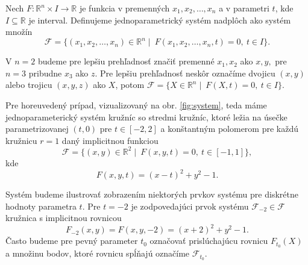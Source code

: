 
\begin{definition}
Nech $F \colon \mathbb{R}^{n} \times I \rightarrow \mathbb{R}$ je funkcia v premenných $ x_{1}, x_{2}, \ldots, x_{n} $ a v parametri $t$, kde $I \subseteq \mathbb{R}$ je interval. Definujeme jednoparametrický systém nadplôch ako systém množín 
$$
\mathcal{F} = \{ (x_{1}, x_{2}, \ldots, x_{n}) \in \mathbb{R}^{n} \mid  \ F(x_{1}, x_{2}, \ldots, x_{n}, t) = 0, \ t \in I \}.
$$
\end{definition}

V $n = 2$ budeme pre lepšiu prehľadnosť značiť premenné $x_{1}, x_{2}$ ako $x, y,$ pre $n = 3$ pribudne $x_{3}$ ako $z.$ Pre lepšiu prehľadnosť neskôr označíme dvojicu $(x,y)$ alebo trojicu $(x,y,z)$ ako $X$, potom
$\mathcal{F} = \{ X \in \mathbb{R}^{n} \mid \ F(X, t) = 0, \ t \in I \}. $

Pre horeuvedený prípad, vizualizovaný na obr. \ref{fig:system}, teda máme jednoparameterický systém kružníc so stredmi kružníc, ktoré ležia na úsečke parametrizovanej $(t,0)$ pre $t \in [-2,2]$ a konštantným polomerom pre každú kružnicu $r = 1$ daný implicitnou funkciou
$$ \mathcal{F} = \{ (x, y) \in \mathbb{R}^{2} \mid \ F(x, y, t) = 0, \ t \in [-1,1] \}, $$
kde
$$ F(x, y, t) = (x - t)^2 + y^2 - 1.$$

Systém budeme ilustrovať zobrazením niektorých prvkov systému pre diskrétne hodnoty parametra $t$. Pre $t = -2$ je zodpovedajúci prvok systému $\mathcal{F}_{-2} \in \mathcal{F}$  kružnica s implicitnou rovnicou
$$ F_{-2}(x, y) = F(x, y, -2) = (x + 2)^2 + y^2 - 1. $$
Často budeme pre pevný parameter $t_0$ označovať prislúchajúcu rovnicu $F_{t_0}(X)$ a množinu bodov, ktoré rovnicu spĺňajú označíme $\mathcal{F}_{t_0}.$

